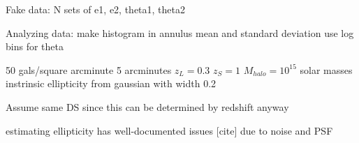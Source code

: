 \documentclass[]{article}
\begin{document}
Fake data:
N sets of e1, e2, theta1, theta2

Analyzing data:
make histogram in annulus
mean and standard deviation
use log bins for theta


50 gals/square arcminute
5 arcminutes
$z_L = 0.3$
$z_S = 1$
$M_{halo} = 10^15$ solar masses
instrinsic ellipticity from gaussian with width 0.2


Assume same DS since this can be determined by redshift anyway

estimating ellipticity has well-documented issues [cite] due to noise and PSF
\end{document}
